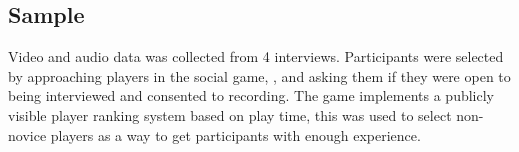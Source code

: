 \subsection{Sample}
Video and audio data was collected from 4 interviews.
Participants were selected by approaching players in the social game, \vrc, and asking them if they were open to being interviewed and consented to recording.
The game implements a publicly visible player ranking system based on play time, this was used to select non-novice players as a way to get participants with enough experience.